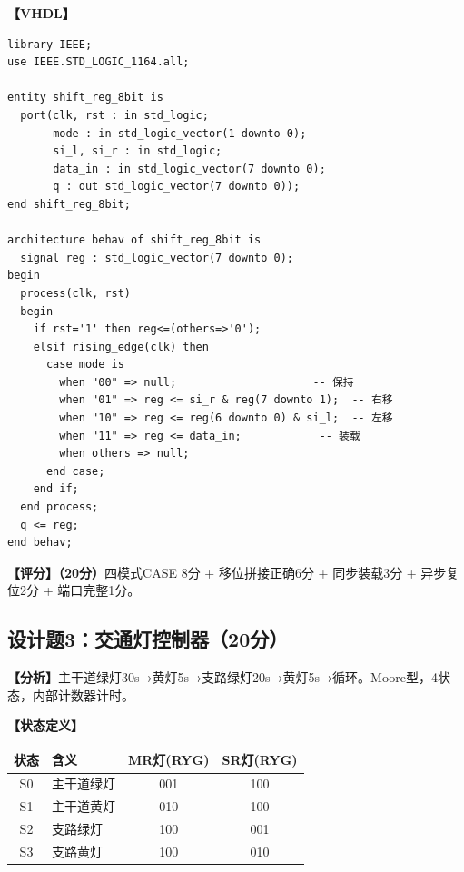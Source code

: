 \textbf{【VHDL】}
\begin{lstlisting}
library IEEE;
use IEEE.STD_LOGIC_1164.all;

entity shift_reg_8bit is
  port(clk, rst : in std_logic;
       mode : in std_logic_vector(1 downto 0);
       si_l, si_r : in std_logic;
       data_in : in std_logic_vector(7 downto 0);
       q : out std_logic_vector(7 downto 0));
end shift_reg_8bit;

architecture behav of shift_reg_8bit is
  signal reg : std_logic_vector(7 downto 0);
begin
  process(clk, rst)
  begin
    if rst='1' then reg<=(others=>'0');
    elsif rising_edge(clk) then
      case mode is
        when "00" => null;                     -- 保持
        when "01" => reg <= si_r & reg(7 downto 1);  -- 右移
        when "10" => reg <= reg(6 downto 0) & si_l;  -- 左移
        when "11" => reg <= data_in;            -- 装载
        when others => null;
      end case;
    end if;
  end process;
  q <= reg;
end behav;
\end{lstlisting}

\textbf{【评分】（20分）}四模式CASE 8分 + 移位拼接正确6分 + 同步装载3分 + 异步复位2分 + 端口完整1分。

\subsection{设计题3：交通灯控制器（20分）}

\textbf{【分析】}主干道绿灯30s→黄灯5s→支路绿灯20s→黄灯5s→循环。Moore型，4状态，内部计数器计时。

\textbf{【状态定义】}
\begin{center}
\begin{tabular}{|c|l|c|c|}
\hline 状态 & 含义 & MR灯(RYG) & SR灯(RYG) \\
\hline S0 & 主干道绿灯 & 001 & 100 \\
S1 & 主干道黄灯 & 010 & 100 \\
S2 & 支路绿灯 & 100 & 001 \\
S3 & 支路黄灯 & 100 & 010 \\
\hline
\end{tabular}
\end{center}

